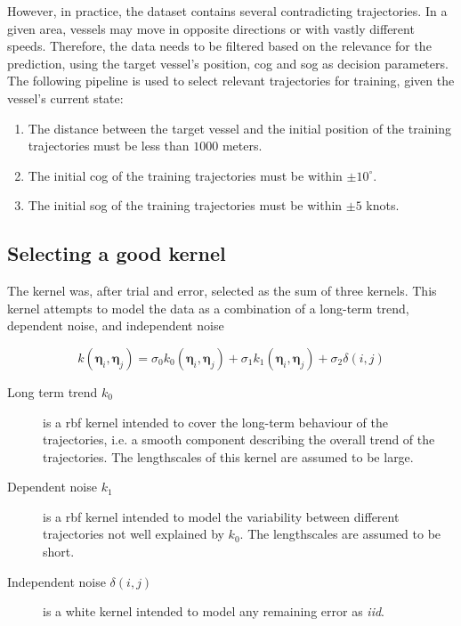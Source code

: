 However, in practice, the dataset contains several contradicting trajectories. In a given area, vessels may move in opposite directions or with vastly different speeds. Therefore, the data needs to be filtered based on the relevance for the prediction, using the target vessel's position, \acrshort{cog} and \acrshort{sog} as decision parameters. The following pipeline is used to select relevant trajectories for training, given the vessel's current state:
\begin{enumerate}
    \item The distance between the target vessel and the initial position of the training trajectories must be less than $1000$ meters.
    \item The initial \acrshort{cog} of the training trajectories must be within $\pm 10^\circ$.
    \item The initial \acrshort{sog} of the training trajectories must be within $\pm 5$ knots.
\end{enumerate}


\subsection{Selecting a good kernel}
The kernel was, after trial and error, selected as the sum of three kernels. This kernel attempts to model the data as a combination of a long-term trend, dependent noise, and independent noise

\begin{equation}\label{eq:gp_ekf_kernel}
    k(\boldsymbol{\eta}_i, \boldsymbol{\eta}_j) = \sigma_0 k_0(\boldsymbol{\eta}_i, \boldsymbol{\eta}_j) + \sigma_1 k_1(\boldsymbol{\eta}_i, \boldsymbol{\eta}_j) +  \sigma_2 \delta(i, j)
\end{equation}

\begin{description}
    \item[Long term trend $k_0$] is a \acrshort{rbf} kernel intended to cover the long-term behaviour of the trajectories, i.e. a smooth component describing the overall trend of the trajectories. The lengthscales of this kernel are assumed to be large.
    \item[Dependent noise $k_1$] is a \acrshort{rbf} kernel intended to model the variability between different trajectories not well explained by $k_0$. The lengthscales are assumed to be short.
    \item[Independent noise $\delta(i, j)$] is a white kernel intended to model any remaining error as \textit{\acrfull{iid}}.
\end{description}

